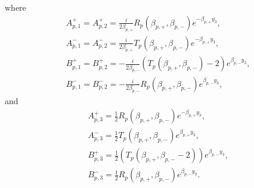 \documentclass[final,reqno]{siamltex}
\begin{document}
where 
\begin{align*}
&A_{p,1}^+=A_{p,2}^+=\frac{i}{2\beta_{p,+}}R_p(\beta_{p,+},\beta_{p,-})e^{-\beta_{p,+}y_3}, \\ &A_{p,1}^-=A_{p,2}^-=\frac{i}{2\beta_{p,+}}T_p(\beta_{p,+},\beta_{p,-})e^{-\beta_{p,+}y_3}, \\
&B_{p,1}^+=B_{p,2}^+=-\frac{i}{2\beta_{p,-}}(T_p(\beta_{p,+},\beta_{p,-})-2)e^{\beta_{p,-}y_3}, \\
&B_{p,1}^-=B_{p,2}^-=-\frac{i}{2\beta_{p,-}}R_p(\beta_{p,+},\beta_{p,-})e^{\beta_{p,-}y_3}, 
\end{align*}
and 
\begin{align*}
&A_{p,3}^+=\frac{1}{2}R_p(\beta_{p,+},\beta_{p,-})e^{-\beta_{p,+}y_3}, \\
&A_{p,3}^-=\frac{1}{2}T_p(\beta_{p,+},\beta_{p,-})e^{\beta_{p,+}y_3}, \\
&B_{p,3}^+=\frac{1}{2}(T_p(\beta_{p,+},\beta_{p,-}-2))e^{\beta_{p,-}y_3}, \\
&B_{p,3}^-=\frac{1}{2}R_p(\beta_{p,+},\beta_{p,-})e^{\beta_{p,-}y_3}. 
\end{align*}
\end{document}
